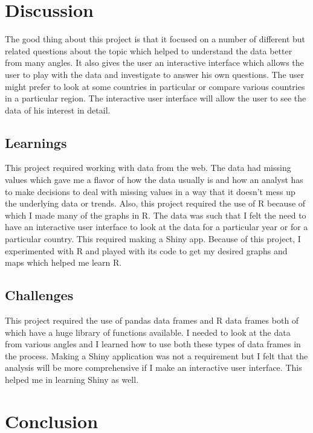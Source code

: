 \documentclass{article}
\begin{document}
\section{Discussion}

The good thing about this project is that it focused on a number of different but related questions about the topic which helped to understand the data better from many angles. It also gives the user an interactive interface which allows the user to play with the data and investigate to answer his own questions. The user might prefer to look at some countries in particular or compare various countries in a particular region. The interactive user interface will allow the user to see the data of his interest in detail.

\subsection{Learnings}

This project required working with data from the web. The data had missing values which gave me a flavor of how the data usually is and how an analyst has to make decisions to deal with missing values in a way that it doesn’t mess up the underlying data or trends. Also, this project required the use of R because of which I made many of the graphs in R. The data was such that I felt the need to have an interactive user interface to look at the data for a particular year or for a particular country. This required making a Shiny app. Because of this project, I experimented with R and played with its code to get my desired graphs and maps which helped me learn R.

\subsection{Challenges}

This project required the use of pandas data frames and R data frames both of which have a huge library of functions available. I needed to look at the data from various angles and I learned how to use both these types of data frames in the process. Making a Shiny application was not a requirement but I felt that the analysis will be more comprehensive if I make an interactive user interface. This helped me in learning Shiny as well.



\section{Conclusion}
\end{document}
